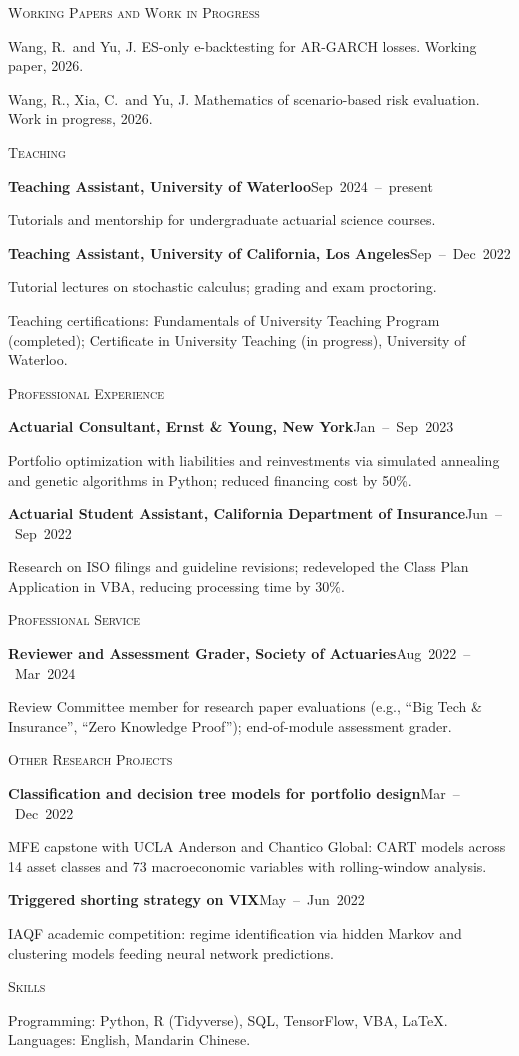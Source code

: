 \documentclass[11pt,letterpaper]{article}
\newcommand{\cvsection}[1]{%
  \vspace{13pt}%
  {\large\scshape #1}\par
  \vspace{1.5pt}{\color{gold}\hrule height 0.7pt}\vspace{7pt}%
}
\newcommand{\entry}[2]{{\textbf{#1}\hfill \mbox{#2}\par}}
\newenvironment{pubs}{%
  \begin{list}{}{\setlength{\leftmargin}{1.6em}\setlength{\itemindent}{-1.6em}%
  \setlength{\itemsep}{5pt}\setlength{\parsep}{0pt}\setlength{\topsep}{2pt}}%
}{\end{list}}
\begin{document}
\cvsection{Working Papers and Work in Progress}

\begin{pubs}
  \item Wang, R.\ and Yu, J. ES-only e-backtesting for AR-GARCH losses. Working paper, 2026.
  \item Wang, R., Xia, C.\ and Yu, J. Mathematics of scenario-based risk evaluation. Work in progress, 2026.
\end{pubs}

\cvsection{Teaching}

\entry{Teaching Assistant, University of Waterloo}{Sep 2024 -- present}
Tutorials and mentorship for undergraduate actuarial science courses.

\vspace{5pt}
\entry{Teaching Assistant, University of California, Los Angeles}{Sep -- Dec 2022}
Tutorial lectures on stochastic calculus; grading and exam proctoring.

\vspace{5pt}
Teaching certifications: Fundamentals of University Teaching Program (completed); Certificate in University Teaching (in progress), University of Waterloo.

\cvsection{Professional Experience}

\entry{Actuarial Consultant, Ernst \& Young, New York}{Jan -- Sep 2023}
Portfolio optimization with liabilities and reinvestments via simulated annealing and genetic algorithms in Python; reduced financing cost by 50\%.

\vspace{5pt}
\entry{Actuarial Student Assistant, California Department of Insurance}{Jun -- Sep 2022}
Research on ISO filings and guideline revisions; redeveloped the Class Plan Application in VBA, reducing processing time by 30\%.

\cvsection{Professional Service}

\entry{Reviewer and Assessment Grader, Society of Actuaries}{Aug 2022 -- Mar 2024}
Review Committee member for research paper evaluations (e.g., ``Big Tech \& Insurance'', ``Zero Knowledge Proof''); end-of-module assessment grader.

\cvsection{Other Research Projects}

\entry{Classification and decision tree models for portfolio design}{Mar -- Dec 2022}
MFE capstone with UCLA Anderson and Chantico Global: CART models across 14 asset classes and 73 macroeconomic variables with rolling-window analysis.

\vspace{5pt}
\entry{Triggered shorting strategy on VIX}{May -- Jun 2022}
IAQF academic competition: regime identification via hidden Markov and clustering models feeding neural network predictions.

\cvsection{Skills}

Programming: Python, R (Tidyverse), SQL, TensorFlow, VBA, \LaTeX.\quad
Languages: English, Mandarin Chinese.
\end{document}
